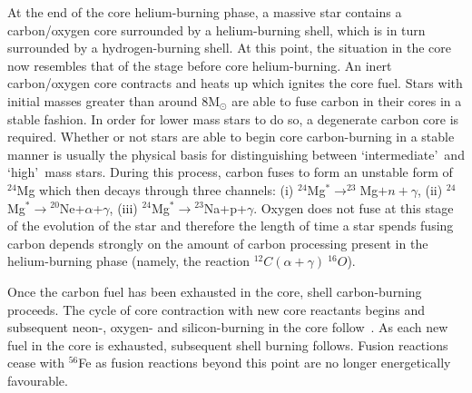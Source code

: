 

At the end of the core helium-burning phase, a massive star contains a carbon/oxygen core surrounded by a helium-burning shell, which is in turn surrounded by a hydrogen-burning shell.
At this point, the situation in the core now resembles that of the stage before core helium-burning.
An inert carbon/oxygen core contracts and heats up which ignites the core fuel.
Stars with initial masses greater than around 8M$_{\odot}$ are able to fuse carbon in their cores in a stable fashion.
In order for lower mass stars to do so, a degenerate carbon core is required.
Whether or not stars are able to begin core carbon-burning in a stable manner is usually the physical basis for distinguishing between \textquoteleft  intermediate\textquoteright ~and \textquoteleft high\textquoteright ~mass stars.
During this process, carbon fuses to form an unstable form of $^{24}$Mg which then decays through three channels: (i) $^{24}$Mg$^{*}$$\rightarrow ^{23}$Mg$ + n + \gamma$, (ii) $^{24}$Mg$^{*}$$\rightarrow$$^{20}$Ne+$\alpha$+$\gamma$, (iii) $^{24}$Mg$^{*}$$\rightarrow$$^{23}$Na+p+$\gamma$.
Oxygen does not fuse at this stage of the evolution of the star and therefore the length of time a star spends fusing carbon depends strongly on the amount of carbon processing present in the helium-burning phase (namely, the reaction $^{12}C(\alpha+\gamma)~^{16}O$).

Once the carbon fuel has been exhausted in the core, shell carbon-burning proceeds.
The cycle of core contraction with new core reactants begins and subsequent neon-, oxygen- and silicon-burning in the core follow~\citep{Woosley02}.
As each new fuel in the core is exhausted, subsequent shell burning follows.
Fusion reactions cease with $^{56}$Fe as fusion reactions beyond this point are no longer energetically favourable.

